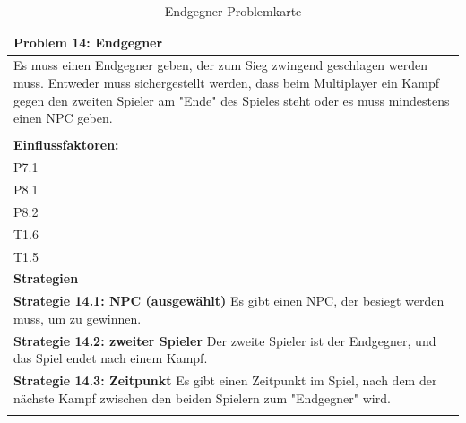 \documentclass[fontsize=12pt,paper=a4,twoside]{scrartcl}
\begin{document}
\begin{table}[H]
    \centering
    \begin{tabular}{|p{15cm}|}
    \hline
          \textbf{Problem 14: Endgegner}  \\ \hline
	Es muss einen Endgegner geben, der zum Sieg zwingend geschlagen werden muss. Entweder muss sichergestellt werden, dass beim Multiplayer ein Kampf gegen den zweiten Spieler am "Ende" des Spieles steht oder es muss mindestens einen NPC geben. \\
         \\ \hline
          \textbf{Einflussfaktoren: } \\
	P7.1 \\
	P8.1 \\
	P8.2 \\
	T1.6 \\
	T1.5 \\
          \hline
          \textbf{Strategien} \\ \hline
            {}          
           \label{strategie:14.1}     
          \textbf{Strategie 14.1: NPC (ausgewählt)} Es gibt einen NPC, der besiegt werden muss, um zu gewinnen.  \\        
  {}          
           \label{strategie:14.2}              
          \textbf{Strategie 14.2: zweiter Spieler} Der zweite Spieler ist der Endgegner, und das Spiel endet nach einem Kampf.  \\
	 {}          
           \label{strategie:14.3}     
          \textbf{Strategie 14.3: Zeitpunkt} Es gibt einen Zeitpunkt im Spiel, nach dem der nächste Kampf zwischen den beiden Spielern zum "Endgegner" wird.  \\ 
	 \\ \hline
    \end{tabular}

    \caption{Endgegner Problemkarte}
    \label{tab:ProblemKarte14}
\end{table}
\end{document}
